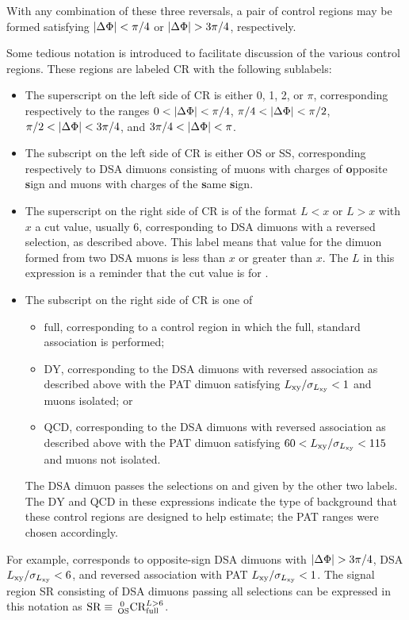 With any combination of these three reversals, a pair of control regions may be formed satisfying $\DeltaPhi < \pi/4$ or $\DeltaPhi > 3\pi/4$, respectively.

Some tedious notation is introduced to facilitate discussion of the various control regions.
These regions are labeled CR with the following sublabels:
\begin{itemize}
  \item The superscript on the left side of CR is either 0, 1, 2, or $\pi$, corresponding respectively to the \DeltaPhi ranges $0 < \DeltaPhi < \pi/4$, $\pi/4 < \DeltaPhi < \pi/2$, $\pi/2 < \DeltaPhi < 3\pi/4$, and $3\pi/4 < \DeltaPhi < \pi$.
  \item The subscript on the left side of CR is either OS or SS, corresponding respectively to DSA dimuons consisting of muons with charges of \textbf{o}pposite \textbf{s}ign and muons with charges of the \textbf{s}ame \textbf{s}ign.
  \item The superscript on the right side of CR is of the format $L<x$ or $L>x$ with $x$ a cut value, usually 6, corresponding to DSA dimuons with a reversed \LxySig selection, as described above. This label means that \LxySig value for the dimuon formed from two DSA muons is less than $x$ or greater than $x$. The $L$ in this expression is a reminder that the cut value is for \LxySig.
  \item The subscript on the right side of CR is one of
    \begin{itemize}
      \item $\mathrm{full}$, corresponding to a control region in which the full, standard \DSAToPAT association is performed;
      \item $\mathrm{DY}$, corresponding to the DSA dimuons with reversed \DSAToPAT association as described above with the PAT dimuon satisfying $\LxySig < 1$ and muons isolated; or
      \item $\mathrm{QCD}$, corresponding to the DSA dimuons with reversed \DSAToPAT association as described above with the PAT dimuon satisfying $60 < \LxySig < 115$ and muons not isolated.
    \end{itemize}
    The DSA dimuon passes the selections on \DeltaPhi and \LxySig given by the other two labels. The $\mathrm{DY}$ and $\mathrm{QCD}$ in these expressions indicate the type of background that these control regions are designed to help estimate; the PAT \LxySig ranges were chosen accordingly.
\end{itemize}
For example,  corresponds to opposite-sign DSA dimuons with \mbox{$\DeltaPhi > 3\pi/4$}, DSA $\LxySig < 6$, and reversed \DSAToPAT association with PAT $\LxySig < 1$.
The signal region SR consisting of DSA dimuons passing all selections can be expressed in this notation as $\mathrm{SR} \equiv\, \CR[OS]{\Full}{>6}{0}$.

